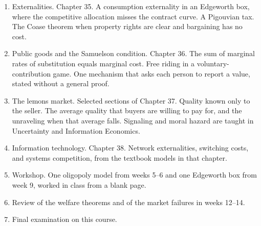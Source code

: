 \documentclass[11pt]{article}
\begin{document}
\begin{enumerate}
\item Externalities. Chapter 35. A consumption externality in an Edgeworth box, where the competitive allocation misses the contract curve. A Pigouvian tax. The Coase theorem when property rights are clear and bargaining has no cost.
\item Public goods and the Samuelson condition. Chapter 36. The sum of marginal rates of substitution equals marginal cost. Free riding in a voluntary-contribution game. One mechanism that asks each person to report a value, stated without a general proof.
\item The lemons market. Selected sections of Chapter 37. Quality known only to the seller. The average quality that buyers are willing to pay for, and the unraveling when that average falls. Signaling and moral hazard are taught in Uncertainty and Information Economics.
\item Information technology. Chapter 38. Network externalities, switching costs, and systems competition, from the textbook models in that chapter.
\item Workshop. One oligopoly model from weeks 5--6 and one Edgeworth box from week 9, worked in class from a blank page.
\item Review of the welfare theorems and of the market failures in weeks 12--14.
\item Final examination on this course.
\end{enumerate}
\end{document}

